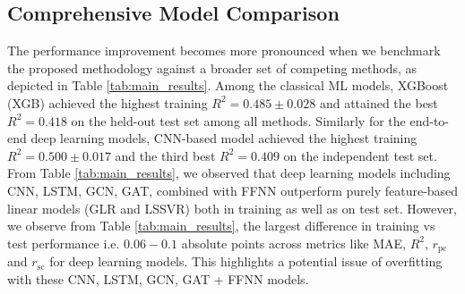 \documentclass[sigconf,authordraft]{acmart}
\begin{document}
\vspace{-2mm}
\subsection{Comprehensive Model Comparison}
The performance improvement becomes more pronounced when we benchmark the proposed methodology against a broader set of competing methods, as depicted in Table \ref{tab:main_results}. Among the classical ML models, XGBoost (XGB) achieved the highest training $R^{2}=0.485 \pm 0.028$ and attained the best $R^{2}=0.418$ on the held-out test set among all methods. Similarly for the end-to-end deep learning models, CNN-based model achieved the highest training $R^{2}=0.500 \pm 0.017$ and the third best $R^{2}=0.409$ on the independent test set. From Table \ref{tab:main_results}, we observed that deep learning models including CNN, LSTM, GCN, GAT, combined with FFNN outperform purely feature-based linear models (GLR and LSSVR) both in training as well as on test set. 
However, we observe from Table \ref{tab:main_results}, the largest difference in training vs test performance i.e. $0.06-0.1$ absolute points across metrics like MAE, $R^{2}$, $r_{\text{pc}}$ and $r_{\text{sc}}$ for deep learning models. This highlights a potential issue of overfitting with these CNN, LSTM, GCN, GAT + FFNN models.  
\end{document}
